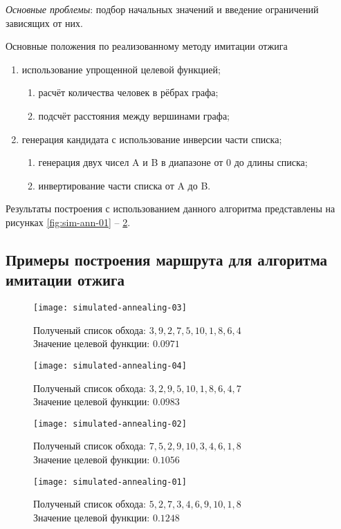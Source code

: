 \emph{Основные проблемы}: подбор начальных значений и введение ограничений зависящих от них.

Основные положения по реализованному методу имитации отжига
\begin{enumerate}
    \item использование упрощенной целевой функцией;
    \begin{enumerate}
        \item расчёт количества человек в рёбрах графа;
        \item подсчёт расстояния между вершинами графа;
    \end{enumerate}
    \item генерация кандидата с использование инверсии части списка;
    \begin{enumerate}
        \item генерация двух чисел A и B в диапазоне от 0 до длины списка;
        \item инвертирование части списка от A до B.
    \end{enumerate}
\end{enumerate}

Результаты построения с использованием данного алгоритма представлены на рисунках 
\ref{fig:sim-ann-01} -- \ref{fig:sim-ann-04}.

\newpage
\subsection{Примеры построения маршрута для алгоритма имитации отжига}
\begin{figure}[ht!]
    \centering
    \texttt{[image: simulated-annealing-03]}
    \caption{Полученый список обхода: \( 3, 9, 2, 7, 5, 10, 1, 8, 6, 4 \)\\
        Значение целевой функции: \( 0.0971 \)}
    \label{fig:sim-ann-01}
    \texttt{[image: simulated-annealing-04]}
    \caption{Полученый список обхода: \( 3, 2, 9, 5, 10, 1, 8, 6, 4, 7 \)\\
        Значение целевой функции: \( 0.0983 \)}
    \label{fig:sim-ann-02}
\end{figure}
\begin{figure}[ht!]
    \centering
    \texttt{[image: simulated-annealing-02]}
    \caption{Полученый список обхода: \( 7, 5, 2, 9, 10, 3, 4, 6, 1, 8 \)\\
        Значение целевой функции: \( 0.1056 \)}
    \label{fig:sim-ann-03}
    \texttt{[image: simulated-annealing-01]}
    \caption{Полученый список обхода: \( 5, 2, 7, 3, 4, 6, 9, 10, 1, 8 \)\\
        Значение целевой функции: \( 0.1248 \)}
    \label{fig:sim-ann-04}
\end{figure}
\newpage

